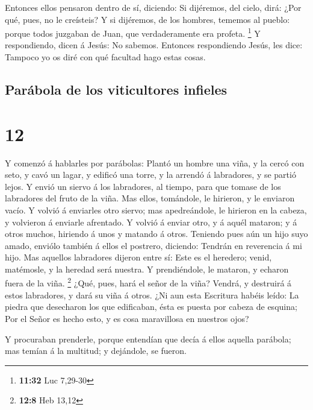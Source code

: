  Entonces ellos pensaron dentro de sí, diciendo: Si
dijéremos, del cielo, dirá: ¿Por qué, pues, no le creísteis?
 Y si dijéremos, de los hombres, tememos al pueblo:
porque todos juzgaban de Juan, que verdaderamente era profeta.
\footnote{\textbf{11:32} Luc 7,29-30}  Y respondiendo,
dicen á Jesús: No sabemos. Entonces respondiendo Jesús, les dice:
Tampoco yo os diré con qué facultad hago estas cosas.

\hypertarget{paruxe1bola-de-los-viticultores-infieles}{%
\subsection{Parábola de los viticultores
infieles}\label{paruxe1bola-de-los-viticultores-infieles}}

\hypertarget{section-11}{%
\section{12}\label{section-11}}

 Y comenzó á hablarles por parábolas: Plantó un hombre una
viña, y la cercó con seto, y cavó un lagar, y edificó una torre, y la
arrendó á labradores, y se partió lejos.  Y envió un
siervo á los labradores, al tiempo, para que tomase de los labradores
del fruto de la viña.  Mas ellos, tomándole, le hirieron,
y le enviaron vacío.  Y volvió á enviarles otro siervo;
mas apedreándole, le hirieron en la cabeza, y volvieron á enviarle
afrentado.  Y volvió á enviar otro, y á aquél mataron; y á
otros muchos, hiriendo á unos y matando á otros.  Teniendo
pues aún un hijo suyo amado, enviólo también á ellos el postrero,
diciendo: Tendrán en reverencia á mi hijo.  Mas aquellos
labradores dijeron entre sí: Este es el heredero; venid, matémosle, y la
heredad será nuestra.  Y prendiéndole, le mataron, y
echaron fuera de la viña. \footnote{\textbf{12:8} Heb 13,12}
 ¿Qué, pues, hará el señor de la viña? Vendrá, y destruirá
á estos labradores, y dará su viña á otros.  ¿Ni aun esta
Escritura habéis leído: La piedra que desecharon los que edificaban,
ésta es puesta por cabeza de esquina;  Por el Señor es
hecho esto, y es cosa maravillosa en nuestros ojos?

 Y procuraban prenderle, porque entendían que decía á
ellos aquella parábola; mas temían á la multitud; y dejándole, se
fueron.

